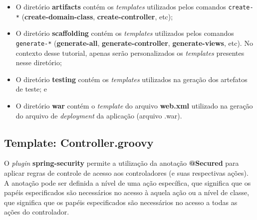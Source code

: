 \begin{itemize}

\vspace{0.2cm}

\item O  diretório {\bf  artifacts} contém os  {\it templates}  utilizados pelos
  comandos      \texttt{create-*}      ({\bf     create-domain-class},      {\bf
    create-controller}, etc);

\vspace{0.2cm}

\item O diretório  {\bf scaffolding} contém os {\it  templates} utilizados pelos
  comandos  \texttt{generate-*} ({\bf generate-all},  {\bf generate-controller},
  {\bf  generate-views},   etc).  No  contexto  desse   tutorial,  apenas  serão
  personalizados os {\it templates} presentes nesse diretório;

\vspace{0.2cm}

\item O diretório {\bf testing}  contém os {\it templates} utilizados na geração
  dos artefatos de teste; e

\vspace{0.2cm}

\item O  diretório {\bf war}  contém o {\it  template} do arquivo  {\bf web.xml}
  utilizado  na geração  do arquivo  de {\it  deployment} da  aplicação (arquivo
  .war).

\end{itemize}

\newpage

\subsection{Template: Controller.groovy}

\vspace{0.5cm}

O  {\it plugin}  {\bf spring-security}  permite  a utilização  da anotação  {\bf
  @Secured} para aplicar regras de  controle de acesso aos controladores (e suas
respectivas  ações).   A  anotação  pode  ser  definida  a  nível  de  uma  ação
específica, que significa que os papéis especificados são necessários no acesso 
à aquela  ação ou a nível de  classe, que significa que  os papéis especificados
são     necessários      no     acesso      a     todas     as      ações     do
controlador.  

